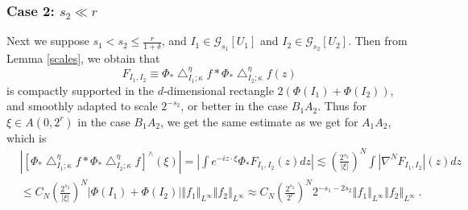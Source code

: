 \documentclass{amsart}%
\theoremstyle{plain}
\numberwithin{equation}{section}
\begin{document}
\subsubsection{Case 2: $s_{2}\ll r$}

Next we suppose $s_{1}<s_{2}\leq\frac{r}{1+\delta}$, and $I_{1}\in
\mathcal{G}_{s_{1}}\left[  U_{1}\right]  $ and $I_{2}\in\mathcal{G}_{s_{2}%
}\left[  U_{2}\right]  $. Then from Lemma \ref{scales}, we obtain that%
\[
F_{I_{1},I_{2}}\equiv\Phi_{\ast}\bigtriangleup_{I_{1};\kappa}^{\eta}f\ast
\Phi_{\ast}\bigtriangleup_{I_{2};\kappa}^{\eta}f\left(  z\right)
\]
is compactly supported in the $d$-dimensional rectangle $2\left(  \Phi\left(
I_{1}\right)  +\Phi\left(  I_{2}\right)  \right)  $, and smoothly adapted to
scale $2^{-s_{2}}$, or better in the case $B_{1}A_{2}$. Thus for $\xi\in
A\left(  0,2^{r}\right)  $ in the case $B_{1}A_{2}$, we get the same estimate
as we get for $A_{1}A_{2}$, which is
\begin{align*}
& \left\vert \left[  \Phi_{\ast}\bigtriangleup_{I_{1};\kappa}^{\eta}f\ast
\Phi_{\ast}\bigtriangleup_{I_{2};\kappa}^{\eta}f\right]  ^{\wedge}\left(
\xi\right)  \right\vert =\left\vert \int e^{-iz\cdot\xi}\Phi_{\ast}%
F_{I_{1},I_{2}}\left(  z\right)  dz\right\vert \lesssim\left(  \frac{2^{s_{2}%
}}{\left\vert \xi\right\vert }\right)  ^{N}\int\left\vert \nabla^{N}%
F_{I_{1},I_{2}}\right\vert \left(  z\right)  dz\\
& \leq C_{N}\left(  \frac{2^{s_{2}}}{\left\vert \xi\right\vert }\right)
^{N}\left\vert \Phi\left(  I_{1}\right)  +\Phi\left(  I_{2}\right)
\right\vert \left\Vert f_{1}\right\Vert _{L^{\infty}}\left\Vert f_{2}%
\right\Vert _{L^{\infty}}\approx C_{N}\left(  \frac{2^{s_{2}}}{2^{r}}\right)
^{N}2^{-s_{1}-2s_{2}}\left\Vert f_{1}\right\Vert _{L^{\infty}}\left\Vert
f_{2}\right\Vert _{L^{\infty}}\ .
\end{align*}
\end{document}
